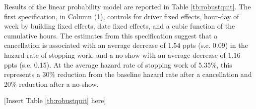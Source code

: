 \documentclass[reviewmode]{restat}
\begin{document}
Results of the linear probability model are reported in Table \ref{tb:robustquit}. 
The first specification, in Column (1), controls for driver fixed effects, hour-day of week by building fixed effects, date fixed effects, and a cubic function of the cumulative hours.
The estimates from this specification suggest that a cancellation is associated with an
average decrease of 1.54 ppts (s.e. 0.09) in the hazard rate of stopping work, and a no-show with an average decrease
of 1.16 ppts (s.e. 0.15). At the average hazard rate of stopping work of 5.35\%, this represents a 30\% reduction from the baseline hazard rate after a cancellation and 20\% reduction after a no-show.

\begin{center}
	[Insert Table \ref{tb:robustquit} here]
\end{center}

\end{document}
